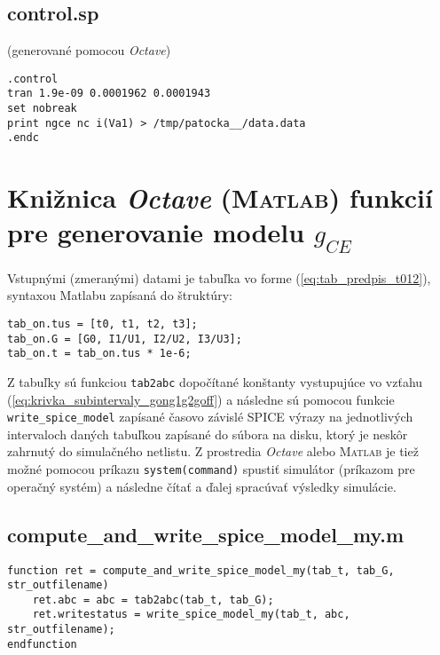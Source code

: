 \subsection{control.sp}

(generované pomocou \textit{Octave})

\begin{lstlisting}
.control
tran 1.9e-09 0.0001962 0.0001943
set nobreak
print ngce nc i(Va1) > /tmp/patocka__/data.data
.endc
\end{lstlisting}


\newpage

\section{Knižnica \textit{Octave} (\textsc{Matlab}) funkcií pre generovanie modelu $g_{CE}$}

Vstupnými (zmeranými) datami je tabuľka vo forme (\ref{eq:tab_predpis_t012}), syntaxou Matlabu zapísaná do štruktúry:
\begin{verbatim}
tab_on.tus = [t0, t1, t2, t3];
tab_on.G = [G0, I1/U1, I2/U2, I3/U3];
tab_on.t = tab_on.tus * 1e-6;
\end{verbatim}
Z tabuľky sú funkciou \texttt{tab2abc} dopočítané konštanty vystupujúce vo vzťahu (\ref{eq:krivka_subintervaly_gong1g2goff}) a následne sú pomocou funkcie \texttt{write\_spice\_model} zapísané časovo závislé SPICE výrazy na jednotlivých intervaloch daných tabuľkou zapísané do súbora na disku, ktorý je neskôr zahrnutý do simulačného netlistu. Z prostredia \textit{Octave} alebo \textsc{Matlab} je tiež možné pomocou príkazu \texttt{system(command)} spustiť simulátor (príkazom pre operačný systém) a následne čítať a ďalej spracúvať výsledky simulácie.

\subsection*{compute\_and\_write\_spice\_model\_my.m}
\begin{lstlisting}
function ret = compute_and_write_spice_model_my(tab_t, tab_G, str_outfilename)
	ret.abc = abc = tab2abc(tab_t, tab_G);
	ret.writestatus = write_spice_model_my(tab_t, abc, str_outfilename);
endfunction
\end{lstlisting}

